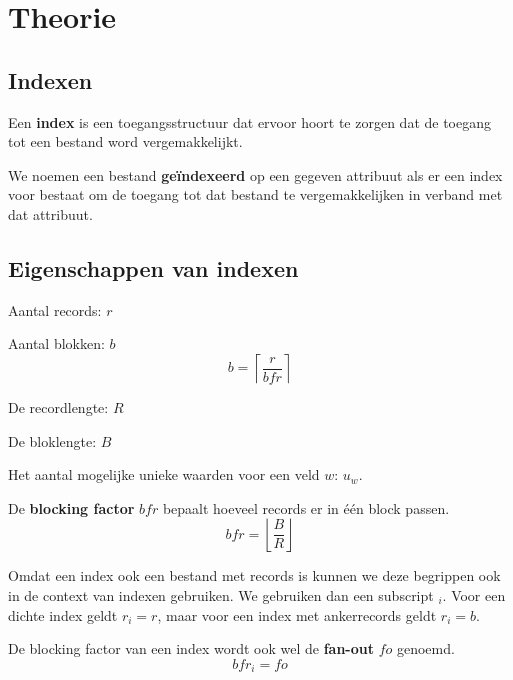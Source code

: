 \documentclass[indexstructuren.tex]{subfiles}
\begin{document}
\chapter{Theorie}
\section{Indexen}
\begin{de}
Een \textbf{index} is een toegangsstructuur dat ervoor hoort te zorgen dat de toegang tot een bestand word vergemakkelijkt.
\end{de}
\begin{de}
We noemen een bestand \textbf{ge\"indexeerd} op een gegeven attribuut als er een index voor bestaat om de toegang tot dat bestand te vergemakkelijken in verband met dat attribuut.
\end{de}

\section{Eigenschappen van indexen}
\begin{de}
Aantal records: $r$
\end{de}

\begin{de}
Aantal blokken: $b$
\[
b = \left\lceil \frac{r}{bfr} \right\rceil
\]
\end{de}

\begin{de}
De recordlengte: $R$
\end{de}

\begin{de}
De bloklengte: $B$
\end{de}

\begin{de}
Het aantal mogelijke unieke waarden voor een veld $w$: $u_w$.
\end{de}

\begin{de}
De \textbf{blocking factor} $bfr$ bepaalt hoeveel records er in \'e\'en block passen.
\[
bfr = \left\lfloor \frac{B}{R} \right\rfloor
\]
\end{de}
Omdat een index ook een bestand met records is kunnen we deze begrippen ook in de context van indexen gebruiken. We gebruiken dan een subscript $_i$.
Voor een dichte index geldt $r_i = r$, maar voor een index met ankerrecords geldt $r_i = b$.
\begin{de}
De blocking factor van een index wordt ook wel de \textbf{fan-out} $fo$ genoemd.
\[
bfr_i = fo
\]
\end{de}
\end{document}
